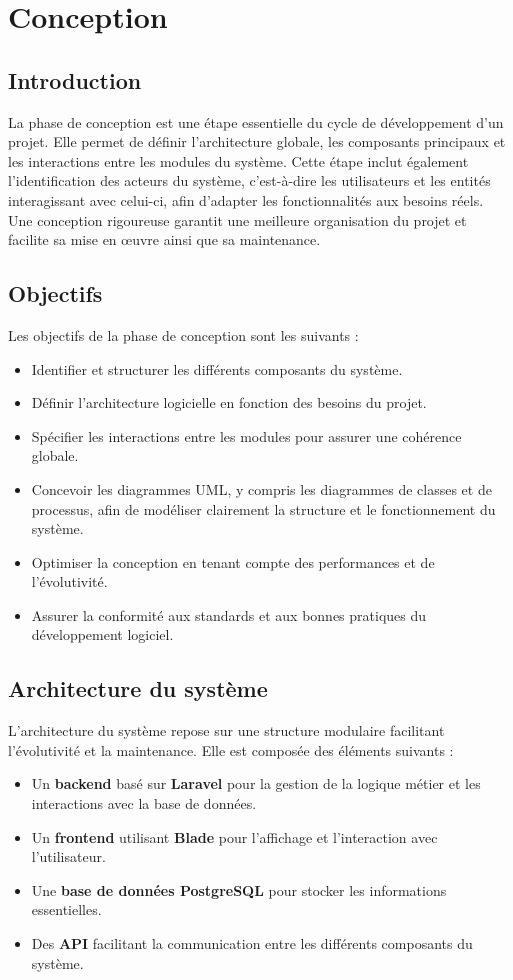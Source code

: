 \chapter{Conception}
\clearpage

\section{Introduction}
La phase de conception est une étape essentielle du cycle de développement d'un projet. Elle permet de définir l'architecture globale, les composants principaux et les interactions entre les modules du système. Cette étape inclut également l'identification des acteurs du système, c'est-à-dire les utilisateurs et les entités interagissant avec celui-ci, afin d'adapter les fonctionnalités aux besoins réels. Une conception rigoureuse garantit une meilleure organisation du projet et facilite sa mise en œuvre ainsi que sa maintenance.

\section{Objectifs}
Les objectifs de la phase de conception sont les suivants :
\begin{itemize}
    \item Identifier et structurer les différents composants du système.
    \item Définir l'architecture logicielle en fonction des besoins du projet.
    \item Spécifier les interactions entre les modules pour assurer une cohérence globale.
    \item Concevoir les diagrammes UML, y compris les diagrammes de classes et de processus, afin de modéliser clairement la structure et le fonctionnement du système.
    \item Optimiser la conception en tenant compte des performances et de l'évolutivité.
    \item Assurer la conformité aux standards et aux bonnes pratiques du développement logiciel.
\end{itemize}

\section{Architecture du système}
L'architecture du système repose sur une structure modulaire facilitant l'évolutivité et la maintenance. Elle est composée des éléments suivants :
\begin{itemize}
    \item Un \textbf{backend} basé sur \textbf{Laravel} pour la gestion de la logique métier et les interactions avec la base de données.
    \item Un \textbf{frontend} utilisant \textbf{Blade} pour l'affichage et l'interaction avec l'utilisateur.
    \item Une \textbf{base de données PostgreSQL} pour stocker les informations essentielles.
    \item Des \textbf{API} facilitant la communication entre les différents composants du système.
\end{itemize}

